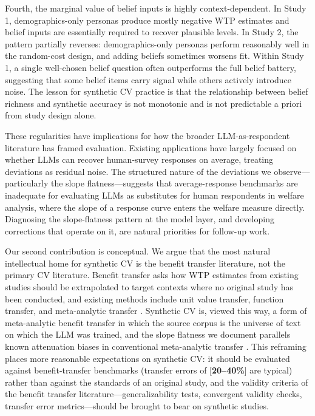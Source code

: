 \documentclass[12pt]{article}
\begin{document}
Fourth, the marginal value of belief inputs is highly context-dependent.
In Study 1, demographics-only personas produce mostly negative WTP
estimates and belief inputs are essentially required to recover plausible
levels. In Study 2, the pattern partially reverses: demographics-only
personas perform reasonably well in the random-cost design, and adding
beliefs sometimes worsens fit. Within Study 1, a single well-chosen belief
question often outperforms the full belief battery, suggesting that some
belief items carry signal while others actively introduce noise. The
lesson for synthetic CV practice is that the relationship between belief
richness and synthetic accuracy is not monotonic and is not predictable
a priori from study design alone.

These regularities have implications for how the broader
LLM-as-respondent literature has framed evaluation. Existing applications
\parencite{Brand2024, Horton2023, Aher2023} have largely focused on whether
LLMs can recover human-survey responses on average, treating deviations as
residual noise. The structured nature of the deviations we observe---
particularly the slope flatness---suggests that average-response benchmarks
are inadequate for evaluating LLMs as substitutes for human respondents in
welfare analysis, where the slope of a response curve enters the welfare
measure directly. Diagnosing the slope-flatness pattern at the model layer,
and developing corrections that operate on it, are natural priorities for
follow-up work.

Our second contribution is conceptual. We argue that the most natural
intellectual home for synthetic CV is the benefit transfer literature, not
the primary CV literature. Benefit transfer asks how WTP estimates from
existing studies should be extrapolated to target contexts where no original
study has been conducted, and existing methods include unit value transfer,
function transfer, and meta-analytic transfer
\parencite{Rosenberger2017, Loomis2015, Boyle2010}. Synthetic CV is, viewed
this way, a form of meta-analytic benefit transfer in which the source
corpus is the universe of text on which the LLM was trained, and the slope
flatness we document parallels known attenuation biases in conventional
meta-analytic transfer \parencite{Bergstrom2008}. This reframing places more
reasonable expectations on synthetic CV: it should be evaluated against
benefit-transfer benchmarks (transfer errors of [\textbf{20--40\%}] are
typical) rather than against the standards of an original study, and the
validity criteria of the benefit transfer literature---generalizability
tests, convergent validity checks, transfer error metrics---should be
brought to bear on synthetic studies.
\end{document}
